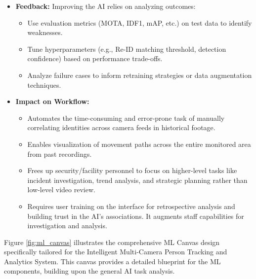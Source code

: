\begin{itemize}
    \item \textbf{Feedback:} Improving the AI relies on analyzing outcomes:
        \begin{itemize}
            \item Use evaluation metrics (MOTA, IDF1, mAP, etc.) on test data to identify weaknesses.
            \item Tune hyperparameters (e.g., Re-ID matching threshold, detection confidence) based on performance trade-offs.
            \item Analyze failure cases to inform retraining strategies or data augmentation techniques.
        \end{itemize}

    \item \textbf{Impact on Workflow:}
        \begin{itemize}
            \item Automates the time-consuming and error-prone task of manually correlating identities across camera feeds in historical footage.
            \item Enables visualization of movement paths across the entire monitored area from past recordings.
            \item Frees up security/facility personnel to focus on higher-level tasks like incident investigation, trend analysis, and strategic planning rather than low-level video review.
            \item Requires user training on the interface for retrospective analysis and building trust in the AI's associations. It augments staff capabilities for investigation and analysis.
        \end{itemize}
\end{itemize}
Figure \ref{fig:ml_canvas} illustrates the comprehensive ML Canvas design specifically tailored for the Intelligent Multi-Camera Person Tracking and Analytics System. This canvas provides a detailed blueprint for the ML components, building upon the general AI task analysis.

